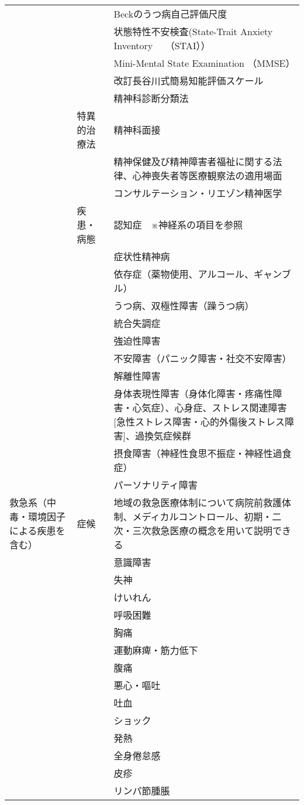 \begin{xltabular}{\linewidth}{XXX}
 &  & Beckのうつ病自己評価尺度 \\
 &  & 状態特性不安検査(State-Trait Anxiety Inventory　 （STAI）） \\
 &  & Mini-Mental State Examination （MMSE） \\
 &  & 改訂長谷川式簡易知能評価スケール \\
 &  & 精神科診断分類法 \\
 & 特異的治療法 & 精神科面接 \\
 &  & 精神保健及び精神障害者福祉に関する法律、心神喪失者等医療観察法の適用場面 \\
 &  & コンサルテーション・リエゾン精神医学 \\
 & 疾患・病態 & 認知症　※神経系の項目を参照 \\
 &  & 症状性精神病 \\
 &  & 依存症（薬物使用、アルコール、ギャンブル） \\
 &  & うつ病、双極性障害（躁うつ病） \\
 &  & 統合失調症 \\
 &  & 強迫性障害 \\
 &  & 不安障害（パニック障害・社交不安障害） \\
 &  & 解離性障害 \\
 &  & 身体表現性障害（身体化障害・疼痛性障害・心気症）、心身症、ストレス関連障害[急性ストレス障害・心的外傷後ストレス障害]、過換気症候群 \\
 &  & 摂食障害（神経性食思不振症・神経性過食症） \\
 &  & パーソナリティ障害 \\
救急系（中毒・環境因子による疾患を含む） & 症候 & 地域の救急医療体制について病院前救護体制、メディカルコントロール、初期・二次・三次救急医療の概念を用いて説明できる \\
 &  & 意識障害 \\
 &  & 失神 \\
 &  & けいれん \\
 &  & 呼吸困難 \\
 &  & 胸痛 \\
 &  & 運動麻痺・筋力低下 \\
 &  & 腹痛 \\
 &  & 悪心・嘔吐 \\
 &  & 吐血 \\
 &  & ショック \\
 &  & 発熱 \\
 &  & 全身倦怠感 \\
 &  & 皮疹 \\
 &  & リンパ節腫脹 \\

\end{xltabular}
